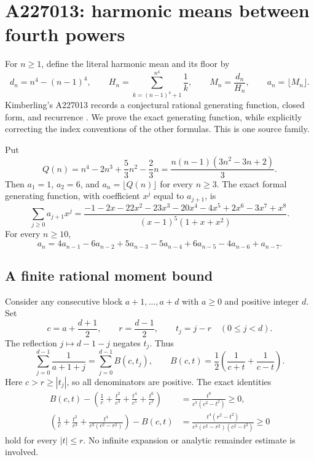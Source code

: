 \section{A227013: harmonic means between fourth powers}
\label{sec:quartic-harmonic}

For $n\ge1$, define the literal harmonic mean and its floor by
\[
 d_n=n^4-(n-1)^4,\qquad
 H_n=\sum_{k=(n-1)^4+1}^{n^4}\frac1k,\qquad
 M_n=\frac{d_n}{H_n},\qquad a_n=\lfloor M_n\rfloor.
\]
Kimberling's A227013 records a conjectural rational generating function,
closed form, and recurrence \cite{oeis227013}. We prove the exact generating
function, while explicitly correcting the index conventions of the other
formulas. This is one source family.

\begin{theorem}\label{thm:quartic-main}
Put
\[
 Q(n)=n^4-2n^3+\frac53n^2-\frac23n
      =\frac{n(n-1)(3n^2-3n+2)}3.
\]
Then $a_1=1$, $a_2=6$, and $a_n=\lfloor Q(n)\rfloor$ for every $n\ge3$.
The exact formal generating function, with coefficient $x^j$ equal to
$a_{j+1}$, is
\begin{equation}\label{eq:quartic-gf}
 \sum_{j\ge0}a_{j+1}x^j=
 \frac{-1-2x-22x^2-23x^3-20x^4-4x^5+2x^6-3x^7+x^8}
 {(x-1)^5(1+x+x^2)}.
\end{equation}
For every $n\ge10$,
\begin{equation}\label{eq:quartic-recurrence}
 a_n=4a_{n-1}-6a_{n-2}+5a_{n-3}-5a_{n-4}
       +6a_{n-5}-4a_{n-6}+a_{n-7}.
\end{equation}
\end{theorem}

\subsection{A finite rational moment bound}

Consider any consecutive block $a+1,\ldots,a+d$ with $a\ge0$ and
positive integer $d$. Set
\[
 c=a+\frac{d+1}2,\qquad r=\frac{d-1}2,\qquad t_j=j-r\quad(0\le j<d).
\]
The reflection $j\mapsto d-1-j$ negates $t_j$. Thus
\begin{equation}\label{eq:quartic-pairing}
 \sum_{j=0}^{d-1}\frac1{a+1+j}
 =\sum_{j=0}^{d-1} B(c,t_j),\qquad
 B(c,t)=\frac12\left(\frac1{c+t}+\frac1{c-t}\right).
\end{equation}
Here $c>r\ge|t_j|$, so all denominators are positive.
The exact identities
\begin{align}
 B(c,t)-\left(\frac1c+\frac{t^2}{c^3}+\frac{t^4}{c^5}+\frac{t^6}{c^7}\right)
 &=\frac{t^8}{c^7(c^2-t^2)}\ge0,\label{eq:quartic-lower-pair}\\
 \left(\frac1c+\frac{t^2}{c^3}+\frac{t^4}{c^3(c^2-r^2)}\right)-B(c,t)
 &=\frac{t^4(r^2-t^2)}{c^3(c^2-r^2)(c^2-t^2)}\ge0
 \label{eq:quartic-upper-pair}
\end{align}
hold for every $|t|\le r$. No infinite expansion or analytic remainder
estimate is involved.

